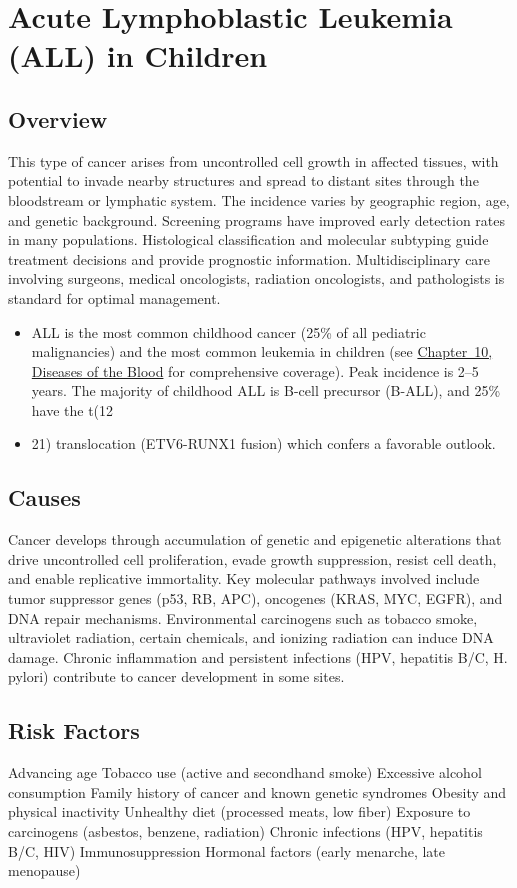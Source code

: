 \chapter{Acute Lymphoblastic Leukemia (ALL) in Children}
\label{sec:Acute Lymphoblastic Leukemia in Children}

\section{Overview}
This type of cancer arises from uncontrolled cell growth in affected tissues, with potential to invade nearby structures and spread to distant sites through the bloodstream or lymphatic system. The incidence varies by geographic region, age, and genetic background. Screening programs have improved early detection rates in many populations. Histological classification and molecular subtyping guide treatment decisions and provide prognostic information. Multidisciplinary care involving surgeons, medical oncologists, radiation oncologists, and pathologists is standard for optimal management.

\begin{itemize}[noitemsep]
  \item ALL is the most common childhood cancer (25\% of all pediatric malignancies) and the most common leukemia in children (see \hyperref[ch:blood]{Chapter~10, Diseases of the Blood} for comprehensive coverage). Peak incidence is 2--5 years. The majority of childhood ALL is B-cell precursor (B-ALL), and 25\% have the t(12
  \item 21) translocation (ETV6-RUNX1 fusion) which confers a favorable outlook.
\end{itemize}
\section{Causes}
Cancer develops through accumulation of genetic and epigenetic alterations that drive uncontrolled cell proliferation, evade growth suppression, resist cell death, and enable replicative immortality. Key molecular pathways involved include tumor suppressor genes (p53, RB, APC), oncogenes (KRAS, MYC, EGFR), and DNA repair mechanisms. Environmental carcinogens such as tobacco smoke, ultraviolet radiation, certain chemicals, and ionizing radiation can induce DNA damage. Chronic inflammation and persistent infections (HPV, hepatitis B/C, H. pylori) contribute to cancer development in some sites.
\section{Risk Factors}
Advancing age Tobacco use (active and secondhand smoke) Excessive alcohol consumption Family history of cancer and known genetic syndromes Obesity and physical inactivity Unhealthy diet (processed meats, low fiber) Exposure to carcinogens (asbestos, benzene, radiation) Chronic infections (HPV, hepatitis B/C, HIV) Immunosuppression Hormonal factors (early menarche, late menopause)

